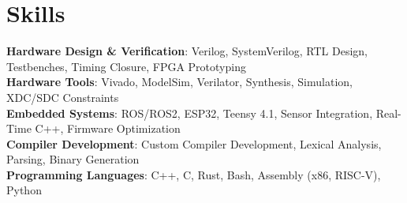 \section{Skills}
 \begin{itemize}[leftmargin=0.15in, label={}]
    \small{\item{
		 \textbf{Hardware Design \& Verification}{: Verilog, SystemVerilog, RTL Design, Testbenches, Timing Closure, FPGA Prototyping} \\
		 \textbf{Hardware Tools}{: Vivado, ModelSim, Verilator, Synthesis, Simulation, XDC/SDC Constraints} \\
		 \textbf{Embedded Systems}{: ROS/ROS2, ESP32, Teensy 4.1, Sensor Integration, Real-Time C++, Firmware Optimization} \\
     \textbf{Compiler Development}{: Custom Compiler Development, Lexical Analysis, Parsing, Binary Generation} \\
     \textbf{Programming Languages}{: C++, C, Rust, Bash, Assembly (x86, RISC-V), Python} \\
    }}
 \end{itemize}
